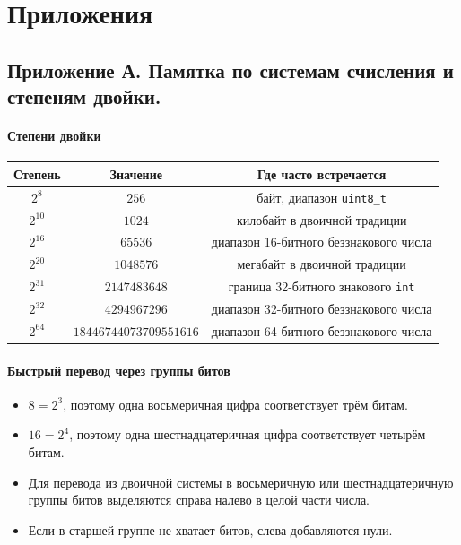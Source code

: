 \appendix
\part{Приложения}

\chapter{Приложение А. Памятка по системам счисления и степеням двойки.}

\subsection*{Степени двойки}
\begin{center}
\begin{tabular}{c|c|c}
Степень & Значение & Где часто встречается \\
\hline
$2^8$ & $256$ & байт, диапазон \texttt{uint8\_t} \\
$2^{10}$ & $1024$ & килобайт в двоичной традиции \\
$2^{16}$ & $65536$ & диапазон 16-битного беззнакового числа \\
$2^{20}$ & $1048576$ & мегабайт в двоичной традиции \\
$2^{31}$ & $2147483648$ & граница 32-битного знакового \texttt{int} \\
$2^{32}$ & $4294967296$ & диапазон 32-битного беззнакового числа \\
$2^{64}$ & $18446744073709551616$ & диапазон 64-битного беззнакового числа \\
\end{tabular}
\end{center}

\subsection*{Быстрый перевод через группы битов}
\begin{itemize}
    \item $8 = 2^3$, поэтому одна восьмеричная цифра соответствует трём битам.
    \item $16 = 2^4$, поэтому одна шестнадцатеричная цифра соответствует четырём битам.
    \item Для перевода из двоичной системы в восьмеричную или шестнадцатеричную группы битов выделяются справа налево в целой части числа.
    \item Если в старшей группе не хватает битов, слева добавляются нули.
\end{itemize}

